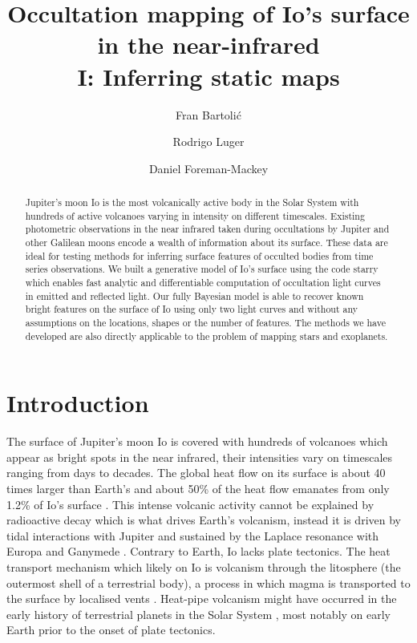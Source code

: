 \documentclass[modern]{aastex62}
\begin{document}
\title{
    \vspace{-3em}
\textbf{    Occultation mapping of Io's surface in the near-infrared \\ I: Inferring static maps} 
}
\author{Fran Bartoli\'c}
\author{Rodrigo Luger}
\author{Daniel Foreman-Mackey}
%

\begin{abstract}
Jupiter's moon Io is the most volcanically active body in the Solar System with hundreds of active volcanoes varying in intensity on different timescales.
Existing photometric observations in the near infrared taken during occultations by Jupiter and other Galilean moons encode a wealth of information about its surface.
These data are ideal for testing methods for inferring surface features of occulted bodies from time series observations.
We built a generative model of Io's surface using the code starry \href{https://rodluger.github.io/starry/}{\color{linkcolor}\faGithub} which enables fast analytic and differentiable computation of occultation light curves in emitted and reflected light.
    Our fully Bayesian model is able to recover known bright features on the surface of Io using only two light curves and without any assumptions on the locations, shapes or the number of features.
    The methods we have developed are also directly applicable to the problem of mapping stars and exoplanets.\href{https://github.com/fbartolic/volcano}{\color{linkcolor}\faGithub}
\end{abstract}

%
\section{Introduction}
The surface of Jupiter's moon Io is covered with hundreds of volcanoes which appear as bright spots in the near infrared, their intensities vary on timescales ranging from days to decades.
The global heat flow on its surface is about 40 times larger than Earth's \citep{breuer2007,davies2010}
and about 50\% of the heat flow emanates from only 1.2\% of Io's surface \citep{veeder2012}.
This intense volcanic activity cannot be explained by radioactive decay which is what drives Earth's volcanism, instead it is driven by tidal interactions with Jupiter and sustained by the Laplace resonance with Europa and Ganymede \citep{peale1979}.
Contrary to Earth, Io lacks plate tectonics.
The heat transport mechanism which likely on Io is volcanism through the litosphere (the outermost shell of a terrestrial body), a process in which magma is transported to the surface by localised vents \cite{oreilly1981}.
Heat-pipe volcanism might have occurred in the early history of terrestrial planets in the Solar System \cite{moore2013,moore2017}, most notably on early Earth prior to the onset of plate tectonics.
\end{document}
